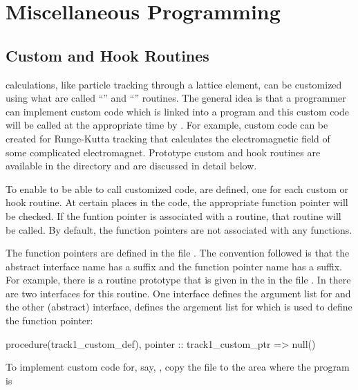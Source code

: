 \chapter{Miscellaneous Programming}

\section{Custom and Hook Routines}
\label{s:custom.hook}

\bmad calculations, like particle tracking through a lattice element, can be customized using what
are called ``'' and ``'' routines. The general idea is that a programmer can
implement custom code which is linked into a program and this custom code will be called at the
appropriate time by \bmad. For example, custom code can be created for Runge-Kutta tracking that
calculates the electromagnetic field of some complicated electromagnet. Prototype custom and hook
routines are available in the  directory and are discussed in detail below.

To enable \bmad to be able to call customized code,  are defined, one for each
custom or hook routine. At certain places in the \bmad code, the appropriate function pointer will
be checked. If the funtion pointer is associated with a routine, that routine will be called. By
default, the function pointers are not associated with any functions.

The function pointers are defined in the file . The convention
followed is that the abstract interface name has a  suffix and the function pointer name
has a  suffix. For example, there is a  routine prototype that is given
in the in the file . In  there
are two interfaces for this routine. One interface defines the argument list for  and the
other (abstract) interface, defines the argement list for  which is used to define
the function pointer:
\begin{example}
  procedure(track1_custom_def), pointer :: track1_custom_ptr => null()
\end{example}

To implement custom code for, say, , copy the file 
to the area where the program is



